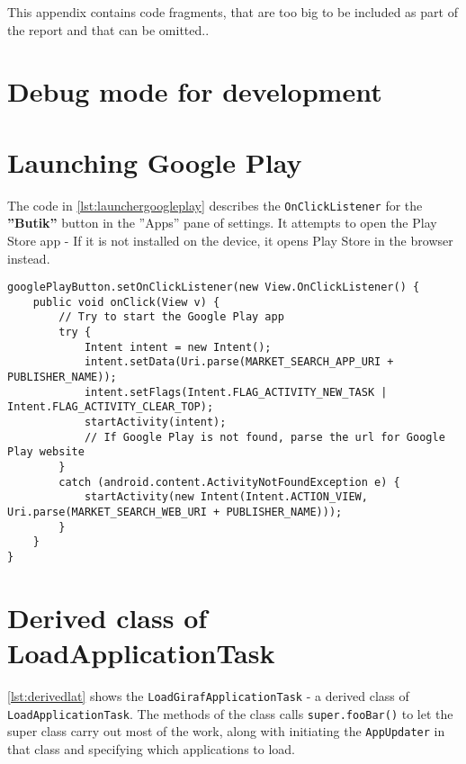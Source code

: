 This appendix contains code fragments, that are too big to be included as part of the report and that can be omitted..

\section {Debug mode for development}\label{appendix:debugmode}



\section{Launching Google Play}

The code in \cref{lst:launchergoogleplay} describes the \lstinline|OnClickListener| for the \textbf{''Butik''} button in the ''Apps'' pane of settings.
It attempts to open the Play Store app - If it is not installed on the device, it opens Play Store in the browser instead.
\begin{lstlisting}[caption={The OnClickListener for the googlePlayButton, launching the Play Store correctly}, label={lst:launchergoogleplay}]
googlePlayButton.setOnClickListener(new View.OnClickListener() {
	public void onClick(View v) {
		// Try to start the Google Play app
		try {
			Intent intent = new Intent();
			intent.setData(Uri.parse(MARKET_SEARCH_APP_URI + PUBLISHER_NAME));
			intent.setFlags(Intent.FLAG_ACTIVITY_NEW_TASK | Intent.FLAG_ACTIVITY_CLEAR_TOP);
			startActivity(intent);
			// If Google Play is not found, parse the url for Google Play website
		} 
		catch (android.content.ActivityNotFoundException e) {
			startActivity(new Intent(Intent.ACTION_VIEW, Uri.parse(MARKET_SEARCH_WEB_URI + PUBLISHER_NAME)));
		}
	}
}
\end{lstlisting}

\section{Derived class of LoadApplicationTask}

\cref{lst:derivedlat} shows the \lstinline|LoadGirafApplicationTask| - a derived class of \lstinline|LoadApplicationTask|.
The methods of the class calls \lstinline|super.fooBar()| to let the super class carry out most of the work, along with initiating the \lstinline|AppUpdater| in that class and specifying which applications to load.


